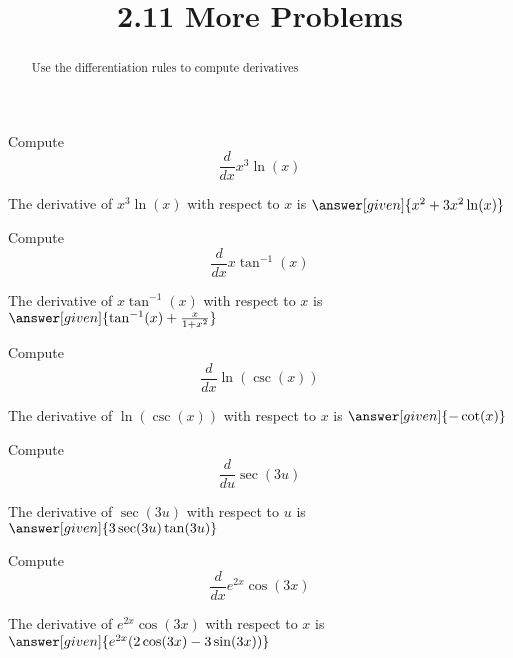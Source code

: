 \documentclass{ximera}
\title{2.11 More Problems}
\begin{document}
\begin{abstract}
Use the differentiation rules to compute derivatives
\end{abstract}

\maketitle








\begin{question} %
  Compute
  \[
  \frac{d}{dx}x^3\ln(x)
  \]
  
    
    
		The derivative of $x^3\ln (x)$ with respect to $x$ is
		 $\answer[given]{x^2 + 3x^2\ln(x)}$
		
\end{question}





\begin{question} %
  Compute
  \[
  \frac{d}{dx} x \tan^{-1} (x)
  \]
  
    
    
		The derivative of $x \tan^{-1} (x)$ with respect to $x$ is
		 $\answer[given]{\tan^{-1}(x) + \frac{x}{1+x^2}}$
		
\end{question}



\begin{question} %
  Compute
  \[
  \frac{d}{dx} \ln(\csc (x))
  \]
  
    
    
		The derivative of $\ln(\csc (x))$ with respect to $x$ is
		 $\answer[given]{-\cot(x)}$
		
\end{question}


\begin{question} %
  Compute
  \[
  \frac{d}{du} \sec(3u)
  \]
  
    
    
		The derivative of $\sec(3u)$ with respect to $u$ is
		 $\answer[given]{3\sec(3u)\tan(3u)}$
		
\end{question}


\begin{question} %
  Compute
  \[
  \frac{d}{dx} e^{2x} \cos(3x)
  \]
  
   
    
		The derivative of $e^{2x} \cos(3x)$ with respect to $x$ is
		 $\answer[given]{e^{2x}(2\cos(3x)-3\sin(3x))}$
		
\end{question}
\end{document}
